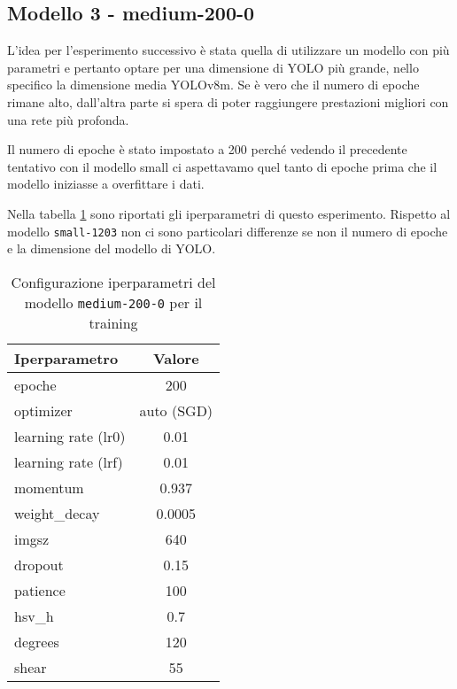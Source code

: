 \subsection*{Modello 3 - medium-200-0}

L'idea per l'esperimento successivo è stata quella di utilizzare un modello con più parametri e
pertanto optare per una dimensione di YOLO più grande, nello specifico la dimensione media YOLOv8m. 
Se è vero che il numero di epoche rimane
alto, dall'altra parte si spera di poter raggiungere prestazioni migliori con una rete più profonda.

Il numero di epoche è stato impostato a 200 perché vedendo il precedente tentativo con il modello small
ci aspettavamo quel tanto di epoche prima che il modello iniziasse a overfittare i dati. 

Nella tabella \ref{tab:v3-model-configs} sono riportati gli iperparametri di questo esperimento. 
Rispetto al modello \texttt{small-1203} non ci sono particolari differenze se non il numero di epoche e 
la dimensione del modello di YOLO. 

\begin{table}[!htb]
    \centering
    \begin{tabular}{lc}
        \hline
        \textbf{Iperparametro} & \textbf{Valore} \\
        \hline
        epoche & 200  \\
        optimizer & auto (SGD) \\
        learning rate (lr0) & 0.01 \\
        learning rate (lrf) & 0.01 \\
        momentum & 0.937 \\
        weight\_decay & 0.0005 \\
        imgsz & 640 \\
        dropout & 0.15 \\
        patience & 100 \\
        \midrule
        hsv\_h & 0.7 \\
        degrees & 120 \\
        shear & 55 \\
        \hline
    \end{tabular}
    \caption{Configurazione iperparametri del modello \texttt{medium-200-0} per il training}
    \label{tab:v3-model-configs}
    \end{table}

